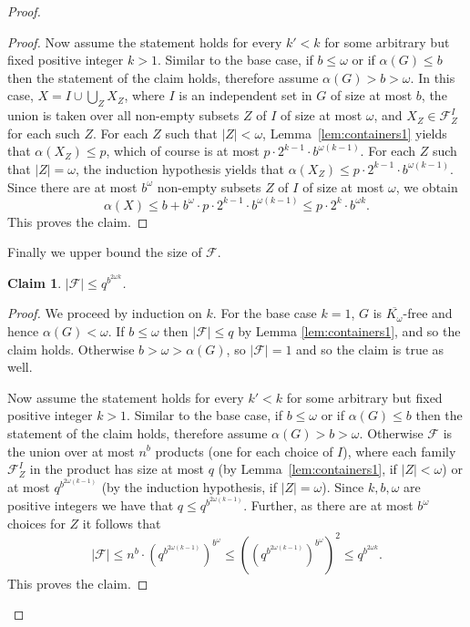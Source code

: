 \documentclass[11pt]{amsart}
\newtheorem{claim}{Claim}[theorem]
\newcommand{\cal}{\mathcal}
\newcounter{tbox}
\newcommand{\sta}[1]{\vspace*{0.3cm}\refstepcounter{tbox}\noindent{ \parbox{\textwidth}{(\thetbox) \emph{#1}}}\vspace*{0.3cm}}
\begin{document}
\begin{proof}
\begin{proof}
Now assume the statement holds for every $k'<k$ for some arbitrary but fixed positive integer $k >1$.
Similar to the base case, if $b \leq \omega$ or if $\alpha(G) \leq b$ then the statement of the claim holds, therefore assume $\alpha(G) > b > \omega$.
% 
In this case, $X = I \cup \bigcup_Z X_Z$, where $I$ is an independent set in $G$ of size at most $b$, the union is taken over all non-empty subsets $Z$ of $I$ of size at most $\omega$, and $X_Z \in {\cal F}_Z^I$ for each such $Z$.
%
For each $Z$ such that $|Z| < \omega$,  Lemma~\ref{lem:containers1} yields that $\alpha(X_Z) \leq p$, which of course is at most $p \cdot 2^{k-1} \cdot b^{\omega (k-1)}$. For each $Z$ such that $|Z| = \omega$,  the induction hypothesis yields that $\alpha(X_Z) \leq p \cdot 2^{k-1} \cdot b^{\omega (k-1)}$.
%
Since there are at most $b^\omega$ non-empty subsets $Z$ of $I$ of size at most $\omega$, we obtain
%
$$\alpha(X) \leq b + b^\omega \cdot p \cdot 2^{k-1} \cdot b^{\omega (k-1)} \leq p \cdot 2^k \cdot b^{\omega k}.$$ 
%
This proves the claim.
\end{proof}

Finally we upper bound the size of ${\cal F}$.

\begin{claim}\label{clm:FBound2}
$|{\cal F}| \leq q^{b^{2\omega k}}$.
\end{claim}
%

\begin{proof}
We proceed by induction on $k$. 
For the base case $k = 1$, $G$ is $\overline{K_\omega}$-free and hence $\alpha(G) < \omega$. 
If $b \leq \omega$ then $|{\cal F}|  \leq q$ by Lemma \ref{lem:containers1}, and so the claim holds.  
Otherwise $b > \omega > \alpha(G)$, so $|{\cal F}| = 1$ and so the claim  is true as well.

Now assume the statement holds for every $k'<k$ for some arbitrary but fixed positive integer $k >1$.
Similar to the base case, if $b \leq \omega$ or if $\alpha(G) \leq b$ then the statement of the claim holds, therefore assume $\alpha(G) > b > \omega$. 
%
Otherwise ${\cal F}$ is the union over at most $n^b$ products (one for each choice of $I$), where each family ${\cal F}_Z^I$ in the product has size at most $q$ (by Lemma~\ref{lem:containers1}, if $|Z| < \omega$) or at most $q^{b^{2\omega (k-1)}}$ (by the induction hypothesis, if $|Z| = \omega$). Since $k,b,\omega$ are positive integers we have that $q \leq q^{b^{2\omega (k-1)}}$. Further, as there are at most $b^\omega$ choices for $Z$ it follows that 
%
$$|{\cal F}| \leq n^b \cdot (q^{b^{2\omega (k-1)}})^{b^\omega} \leq ((q^{b^{2\omega (k-1)}})^{b^\omega})^2 \leq q^{b^{2\omega k}}.$$
%
This proves the claim.
\end{proof}


\end{proof}
\end{document}
